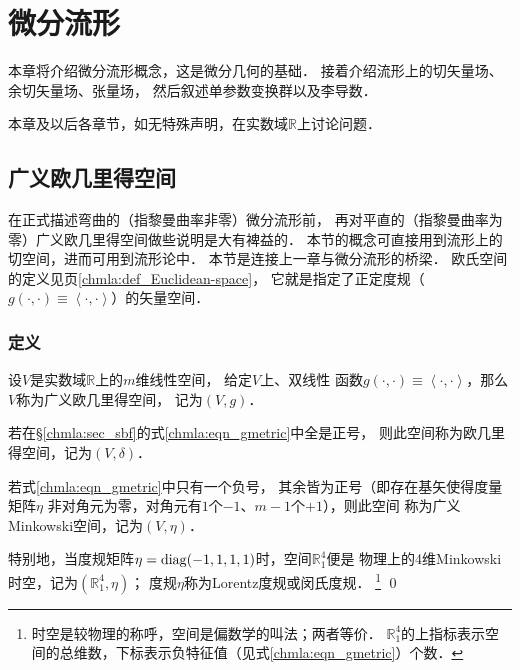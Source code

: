 
\chapter{微分流形}\label{chdm}
本章将介绍微分流形概念，这是微分几何的基础．
接着介绍流形上的切矢量场、余切矢量场、张量场，
然后叙述单参数变换群以及李导数．


本章及以后各章节，如无特殊声明，在实数域$\mathbb{R}$上讨论问题．


\section{广义欧几里得空间}\label{chdm:sec_Euclidean-space}
在正式描述弯曲的（指黎曼曲率非零）微分流形前，
再对平直的（指黎曼曲率为零）广义欧几里得空间做些说明是大有裨益的．
本节的概念可直接用到流形上的切空间，进而可用到流形论中．
本节是连接上一章与微分流形的桥梁．
欧氏空间的定义见\pageref{chmla:def_Euclidean-space}页\ref{chmla:def_Euclidean-space}，
它就是指定了正定度规（$g(\cdot,\cdot)\equiv \left<\cdot,\cdot\right>$）的矢量空间．


\subsection{定义}\label{chdm:sec_gen-Euclidean-space}

\begin{definition}\label{chdm:def_MinkowskiSpace}
    设$V$是实数域$\mathbb{R}$上的$m$维线性空间，
    给定$V$上{、}双线性
    函数$g(\cdot,\cdot)\equiv \left<\cdot,\cdot\right>$，那么$V$称为{\heiti 广义欧几里得空间}，
    记为$(V,g)$．
    
    若在\S \ref{chmla:sec_sbf}的式\eqref{chmla:eqn_gmetric}中全是正号，
    则此空间称为{\heiti 欧几里得空间}，记为$(V,\delta)$．
    
    若式\eqref{chmla:eqn_gmetric}中只有一个负号，
    其余皆为正号（即存在基矢使得度量矩阵$\eta$
    非对角元为零，对角元有$1$个$-1$、$m-1$个$+1$），则此空间
    称为广义{\heiti Minkowski空间}，记为$(V,\eta)$．
    
    特别地，当度规矩阵$\eta = {\rm diag}(-1,1,1,1)$时，空间$\mathbb{R}^4_1$便是
    物理上的4维{\heiti Minkowski时空}，记为$(\mathbb{R}^4_1,\eta)$；
    度规$\eta$称为{\heiti Lorentz度规}或闵氏度规．  
    {\footnote{{\kaishu 时空}是较物理的称呼，{\kaishu 空间}是偏数学的叫法；两者等价．
    $\mathbb{R}^4_1$的上指标表示空间的总维数，下标表示负特征值（见式\eqref{chmla:eqn_gmetric}）个数．}}
    \qed
    
    
     
     
     
\end{definition}

